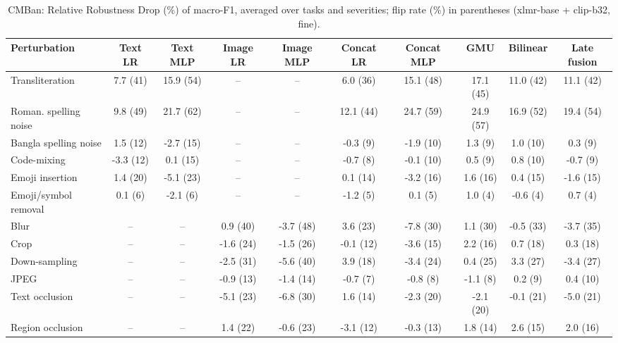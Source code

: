 \begin{table}[t]
\centering
\small
\caption{CMBan: Relative Robustness Drop (\%) of macro-F1, averaged over tasks and severities; flip rate (\%) in parentheses (xlmr-base + clip-b32, fine).}
\label{tab:rob_fine_cmban}
\begin{adjustbox}{max width=\textwidth}
\begin{tabular}{lccccccccc}
\toprule
Perturbation & Text LR & Text MLP & Image LR & Image MLP & Concat LR & Concat MLP & GMU & Bilinear & Late fusion \\
\midrule
Transliteration & 7.7 (41) & 15.9 (54) & -- & -- & 6.0 (36) & 15.1 (48) & 17.1 (45) & 11.0 (42) & 11.1 (42) \\
Roman. spelling noise & 9.8 (49) & 21.7 (62) & -- & -- & 12.1 (44) & 24.7 (59) & 24.9 (57) & 16.9 (52) & 19.4 (54) \\
Bangla spelling noise & 1.5 (12) & -2.7 (15) & -- & -- & -0.3 (9) & -1.9 (10) & 1.3 (9) & 1.0 (10) & 0.3 (9) \\
Code-mixing & -3.3 (12) & 0.1 (15) & -- & -- & -0.7 (8) & -0.1 (10) & 0.5 (9) & 0.8 (10) & -0.7 (9) \\
Emoji insertion & 1.4 (20) & -5.1 (23) & -- & -- & 0.1 (14) & -3.2 (16) & 1.6 (16) & 0.4 (15) & -1.6 (15) \\
Emoji/symbol removal & 0.1 (6) & -2.1 (6) & -- & -- & -1.2 (5) & 0.1 (5) & 1.0 (4) & -0.6 (4) & 0.7 (4) \\
Blur & -- & -- & 0.9 (40) & -3.7 (48) & 3.6 (23) & -7.8 (30) & 1.1 (30) & -0.5 (33) & -3.7 (35) \\
Crop & -- & -- & -1.6 (24) & -1.5 (26) & -0.1 (12) & -3.6 (15) & 2.2 (16) & 0.7 (18) & 0.3 (18) \\
Down-sampling & -- & -- & -2.5 (31) & -5.6 (40) & 3.9 (18) & -3.4 (24) & 0.4 (25) & 3.3 (27) & -3.4 (27) \\
JPEG & -- & -- & -0.9 (13) & -1.4 (14) & -0.7 (7) & -0.8 (8) & -1.1 (8) & 0.2 (9) & 0.4 (10) \\
Text occlusion & -- & -- & -5.1 (23) & -6.8 (30) & 1.6 (14) & -2.3 (20) & -2.1 (20) & -0.1 (21) & -5.0 (21) \\
Region occlusion & -- & -- & 1.4 (22) & -0.6 (23) & -3.1 (12) & -0.3 (13) & 1.8 (14) & 2.6 (15) & 2.0 (16) \\
\bottomrule
\end{tabular}
\end{adjustbox}
\end{table}
